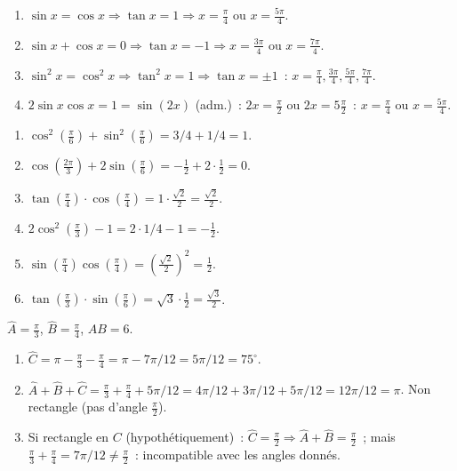 
\begin{enumerate}
  \item $\sin x=\cos x\Rightarrow\tan x=1\Rightarrow x=\frac{\pi}{4}$ ou $x=\frac{5\pi}{4}$.
  \item $\sin x+\cos x=0\Rightarrow\tan x=-1\Rightarrow x=\frac{3\pi}{4}$ ou $x=\frac{7\pi}{4}$.
  \item $\sin^2x=\cos^2x\Rightarrow\tan^2x=1\Rightarrow\tan x=\pm1$~: $x=\frac{\pi}{4},\frac{3\pi}{4},\frac{5\pi}{4},\frac{7\pi}{4}$.
  \item $2\sin x\cos x=1=\sin(2x)$ (adm.)~: $2x=\frac{\pi}{2}$ ou $2x=5\frac{\pi}{2}$~: $x=\frac{\pi}{4}$ ou $x=\frac{5\pi}{4}$.
\end{enumerate}


\begin{enumerate}
  \item $\cos^2(\frac{\pi}{6})+\sin^2(\frac{\pi}{6})=3/4+1/4=1$.
  \item $\cos(\frac{2\pi}{3})+2\sin(\frac{\pi}{6})=-\frac{1}{2}+2\cdot\frac{1}{2}=0$.
  \item $\tan(\frac{\pi}{4})\cdot\cos(\frac{\pi}{4})=1\cdot\frac{\sqrt{2}}{2}=\frac{\sqrt{2}}{2}$.
  \item $2\cos^2(\frac{\pi}{3})-1=2\cdot1/4-1=-\frac{1}{2}$.
  \item $\sin(\frac{\pi}{4})\cos(\frac{\pi}{4})=(\frac{\sqrt{2}}{2})^2=\frac{1}{2}$.
  \item $\tan(\frac{\pi}{3})\cdot\sin(\frac{\pi}{6})=\sqrt{3}\cdot\frac{1}{2}=\frac{\sqrt{3}}{2}$.
\end{enumerate}


$\widehat{A}=\frac{\pi}{3}$, $\widehat{B}=\frac{\pi}{4}$, $AB=6$.
\begin{enumerate}
  \item $\widehat{C}=\pi-\frac{\pi}{3}-\frac{\pi}{4}=\pi-7\pi/12=5\pi/12=75^{\circ}$.
  \item $\widehat{A}+\widehat{B}+\widehat{C}=\frac{\pi}{3}+\frac{\pi}{4}+5\pi/12=4\pi/12+3\pi/12+5\pi/12=12\pi/12=\pi$.\checkmark
        Non rectangle (pas d'angle $\frac{\pi}{2}$).
  \item Si rectangle en $C$ (hypothétiquement)~: $\widehat{C}=\frac{\pi}{2}\Rightarrow\widehat{A}+\widehat{B}=\frac{\pi}{2}$~;
        mais $\frac{\pi}{3}+\frac{\pi}{4}=7\pi/12\ne\frac{\pi}{2}$~: incompatible avec les angles donn\'es.
\end{enumerate}

